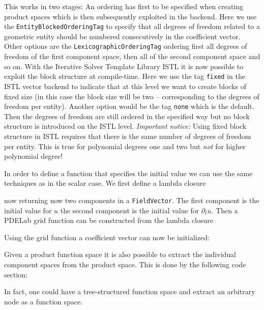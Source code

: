 \documentclass[a4paper,12pt]{article}
\begin{document}
This works in two stages: An ordering has first to be specified when creating product spaces
which is then subsequently exploited in the backend.
Here we use the \lstinline{EntityBlockedOrderingTag} to specify that all degrees of
freedom related to a geometric entity should be numbered consecutively in
the coefficient vector. Other options are the \lstinline{LexicographicOrderingTag}
ordering first all degrees of freedom of the first component space, then
all of the second component space and so on.
With the Iterative Solver Template Library ISTL it is now
possible to exploit the block structure at compile-time.
Here we use the tag \lstinline{fixed} in the ISTL vector backend to indicate
that at this level we want to create blocks of fixed size (in this case the block size will be two --
corresponding to the degrees of freedom per entity). Another option
would be the tag \lstinline{none} which is the default. Then the degrees
of freedom are still ordered in the specified way but no block structure is
introduced on the ISTL level. \textit{Important notice:} Using fixed block
structure in ISTL requires that there is the same number of degrees of freedom
per entity. This is true for polynomial degrees one and two but \textit{not}
for higher polynomial degree!

In order to define a function that specifies the initial value we can
use the same techniques as in the scalar case. We first define a lambda
closure

now returning now two components in a \lstinline{FieldVector}.
The first component is the initial value for $u$ the second component
is the initial value for $\partial_t u$. Then a PDELab grid function
can be constructed from the lambda closure


Using the grid function a coefficient vector can now be initialized:


Given a product function space it is also possible to
extract the individual component spaces from the product
space. This is done by the following code section:

In fact, one could have a tree-structured function space and
extract an arbitrary node as a function space.
\end{document}
